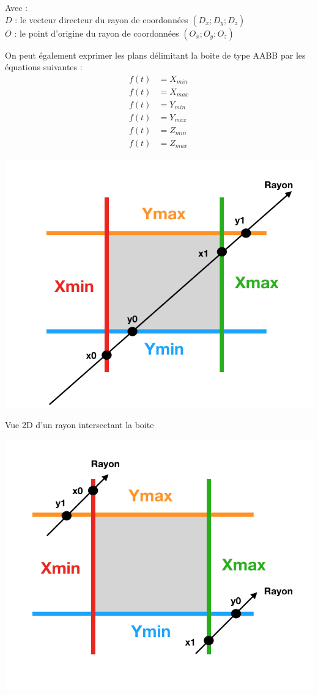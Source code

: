 Avec : \\
$D$ : le vecteur directeur du rayon de coordonnées $(D_x ; D_y ; D_z)$ \\
$O$ : le point d'origine du rayon de coordonnées $(O_x ; O_y ; O_z)$

On peut également exprimer les plans délimitant la boite de type \gls{AABB} par les équations suivantes :
\begin{align}
f(t) &= X_{min}  \\
f(t) &= X_{max}  \\
f(t) &= Y_{min}  \\
f(t) &= Y_{max} \\
f(t) &= Z_{min} \\
f(t) &= Z_{max}
\end{align}


\begin{figureth}
	\begin{subfigureth}{0.45\textwidth}
		\includegraphics[width=\linewidth]{images/AABB}
		\caption{Vue 2D d'un rayon intersectant la boite}
		\label{AABB}
	\end{subfigureth}
	\qquad
	\begin{subfigureth}{0.45\textwidth}
		\includegraphics[width=\linewidth]{images/AABB2}

\end{subfigureth}
\end{figureth}
